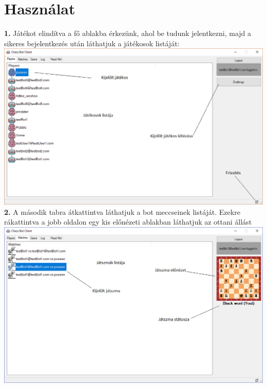 \documentclass[twoside, a4paper, 12pt]{book}
\begin{document}
\section{Használat}
\noindent \textbf{1.} Játékot elindítva a fő ablakba érkezünk, ahol be tudunk jelentkezni, majd a sikeres bejelentkezés után láthatjuk a játékosok listáját: \\
\includegraphics[width=1.0\textwidth]{img/botClient_1.png} \\

\noindent \textbf{2.} A második tabra átkattintva láthatjuk a bot meccseinek listáját. Ezekre rákattintva a jobb oldalon egy kis előnézeti ablakban láthatjuk az ottani állást \\
\includegraphics[width=1.0\textwidth]{img/botClient_2.png} \\
\end{document}
